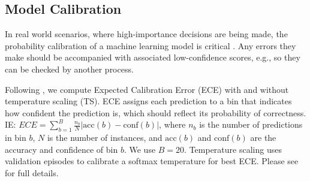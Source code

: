 \documentclass[10pt,twocolumn,letterpaper]{article}
\begin{document}
\subsection{Model Calibration}


In real world scenarios, where high-importance decisions are being made, the probability calibration of a machine learning model is critical \cite{guo2017calibration}. Any errors they make should be accompanied with associated low-confidence scores, e.g., so they can be checked by another process. 

Following \cite{nixon2019measuring,guo2017calibration}, we compute Expected Calibration Error (ECE) with and without temperature scaling (TS). ECE assigns each prediction to a bin that indicates how confident the prediction is, which should reflect its probability of correctness. IE: $ECE=\sum_{b=1}^{B}\frac{n_b}{N}\left | \mathrm{acc}(b)-\mathrm{conf}(b) \right |$, where $n_b$ is the number of predictions in bin $b$, $N$ is the number of instances, and $\mathrm{acc}(b)$ and $\mathrm{conf}(b)$ are the accuracy and confidence of bin $b$. We use $B=20$. Temperature scaling uses validation episodes to calibrate a softmax temperature for best ECE. Please see \cite{nixon2019measuring,guo2017calibration} for full details. 
\end{document}
